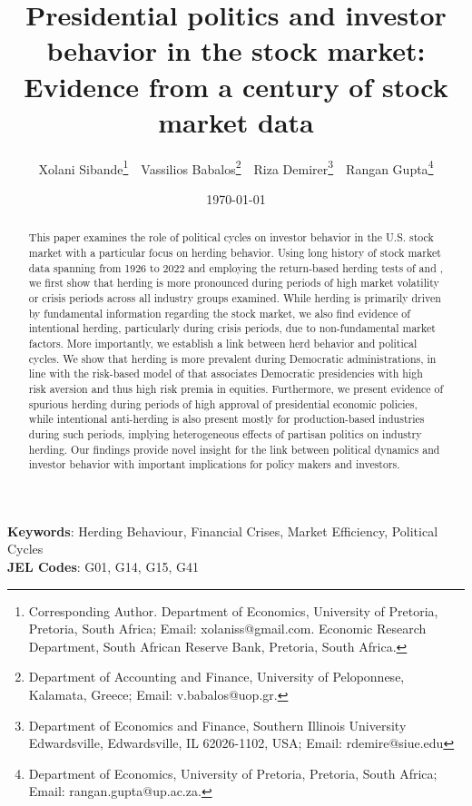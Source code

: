 
\title{Presidential politics and investor behavior in the stock market: Evidence from a century of stock market data}


\author { Xolani Sibande\footnote{Corresponding Author. Department of Economics, University of Pretoria, Pretoria, South Africa; Email: xolaniss@gmail.com. Economic Research Department, South African Reserve Bank, Pretoria, South Africa.} \,\, 
Vassilios Babalos\footnote{Department of Accounting and Finance, University of Peloponnese, Kalamata,  Greece; Email: v.babalos@uop.gr.} \,\,
Riza Demirer\footnote{Department of Economics and Finance, Southern Illinois University Edwardsville, Edwardsville, IL 62026-1102, USA; Email: rdemire@siue.edu} \,\,
Rangan Gupta\footnote{Department of Economics, University of Pretoria, Pretoria, South Africa; Email: rangan.gupta@up.ac.za.}
}
\date{\today}
\maketitle

\begin{abstract}

This paper examines the role of political cycles on investor behavior in the U.S. stock market with a particular focus on herding behavior. Using long history of stock market data spanning from 1926 to 2022 and employing the return-based herding tests of \cite{christie1995following} and \cite{chang2000examination}, we first show that herding is more pronounced during periods of high market volatility or crisis periods across all industry groups examined. While herding is primarily driven by fundamental information regarding the stock market, we also find evidence of intentional herding, particularly during crisis periods, due to non-fundamental market factors. More importantly, we establish a link between herd behavior and political cycles. We show that herding is more prevalent during Democratic administrations, in line with the risk-based model of \cite{pastor2020political} that associates Democratic presidencies with high risk aversion and thus high risk premia in equities. Furthermore, we present evidence of spurious herding during periods of high approval of presidential economic policies, while intentional anti-herding is also present mostly for production-based industries during such periods, implying heterogeneous effects of partisan politics on industry herding. Our findings provide novel insight for the link between political dynamics and investor behavior with important implications for policy makers and investors. 

\end{abstract}

\noindent\textbf{Keywords}: Herding Behaviour, Financial Crises, Market Efficiency, Political Cycles
\\
\textbf{JEL Codes}: G01, G14, G15, G41
\newpage